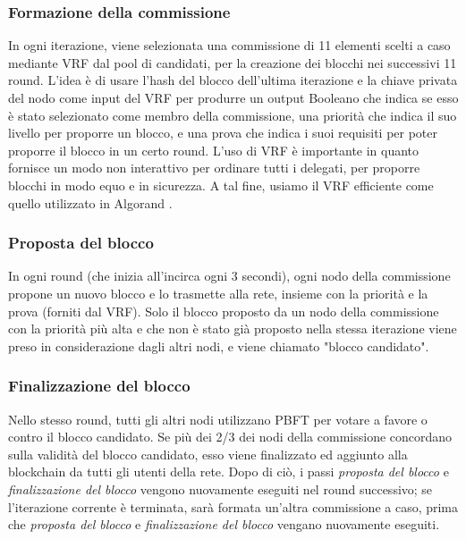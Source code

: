 \subsubsection{Formazione della commissione}
In ogni iterazione, viene selezionata una commissione di 11 elementi scelti a caso mediante VRF dal pool di candidati, per la creazione dei blocchi nei successivi 11 round. L'idea è di usare l'hash del blocco dell'ultima iterazione e la chiave privata del nodo come input del VRF per produrre un output Booleano che indica se esso è stato selezionato come membro della commissione, una priorità che indica il suo livello per proporre un blocco, e una prova che indica i suoi requisiti per poter proporre il blocco in un certo round. L'uso di VRF è importante in quanto fornisce un modo non interattivo per ordinare tutti i delegati, per proporre blocchi in modo equo e in sicurezza. A tal fine, usiamo il VRF efficiente come quello utilizzato in Algorand \cite{c12}.

\subsubsection{Proposta del blocco}
In ogni round (che inizia all'incirca ogni 3 secondi), ogni nodo della commissione propone un nuovo blocco e lo trasmette alla rete, insieme con la priorità e la prova (forniti dal VRF). Solo il blocco proposto da un nodo della commissione con la priorità più alta e che non è stato già proposto nella stessa iterazione viene preso in considerazione dagli altri nodi, e viene chiamato "blocco candidato".

\subsubsection{Finalizzazione del blocco}
Nello stesso round, tutti gli altri nodi utilizzano PBFT per votare a favore o contro il blocco candidato. Se più dei 2/3 dei nodi della commissione concordano sulla validità del blocco candidato, esso viene finalizzato ed aggiunto alla blockchain da tutti gli utenti della rete. Dopo di ciò, i passi \emph{proposta del blocco} e \emph{finalizzazione del blocco} vengono nuovamente eseguiti nel round successivo; se l'iterazione corrente è terminata, sarà formata un'altra commissione a caso, prima che \emph{proposta del blocco} e \emph{finalizzazione del blocco} vengano nuovamente eseguiti.

